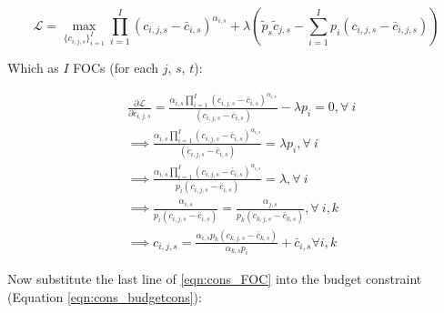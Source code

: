 \documentclass[letterpaper,12pt]{article}
\theoremstyle{definition}
\begin{document}
\begin{spacing}{1.5}
    \begin{equation} \label{eqn:cons_lagrangian}
       \mathcal{L} =  \max_{\{c_{i,j,s}\}_{i=1}^{I}}  \prod_{i=1}^I \left( c_{i,j,s} - \bar c_{i,s} \right) ^{\alpha_{i,s}}  + \lambda \left(\tilde{p}_{s}\tilde{c}_{j,s} - \sum_{i=1}^{I} p_{i}(c_{i,j,s}-\bar{c}_{i,j,s})\right)
    \end{equation}
    
    Which as $I$ FOCs (for each $j$, $s$, $t$):
    
      \begin{equation} \label{eqn:cons_FOC}
      \begin{split}
       & \frac{\partial \mathcal{L}}{\partial c_{i,j,s}} = \frac{\alpha_{i,s} \prod_{i=1}^I \left( c_{i,j,s} - \bar c_{i,s} \right) ^{\alpha_{i,s}}}{(c_{i,j,s}-\bar{c}_{i,s})}-\lambda p_{i} = 0, \forall \ i  \\
       & \implies  \frac{\alpha_{i,s} \prod_{i=1}^I \left( c_{i,j,s} - \bar c_{i,s} \right) ^{\alpha_{i,s}}}{(c_{i,j,s}-\bar{c}_{i,s})} = \lambda p_{i}, \forall \ i \\
       & \implies  \frac{\alpha_{i,s} \prod_{i=1}^I \left( c_{i,j,s} - \bar c_{i,s} \right) ^{\alpha_{i,s}}}{ p_{i}(c_{i,j,s}-\bar{c}_{i,s})} = \lambda, \forall \ i \\
       & \implies \frac{\alpha_{i,s}}{p_{i}(c_{i,j,s}-\bar{c}_{i,s})}=\frac{\alpha_{j,s}}{p_{k}(c_{k,j,s}-\bar{c}_{k,s})}, \forall \ i,k \\
       & \implies c_{i,j,s}= \frac{\alpha_{i,s} p_{k}(c_{k,j,s}-\bar{c}_{k,s})}{\alpha_{k,s} p_{i}} + \bar{c}_{i,s} \forall i,k 
       \end{split}
    \end{equation}
    
    Now substitute the last line of \ref{eqn:cons_FOC} into the budget constraint (Equation \ref{eqn:cons_budgetcons}):
    

\end{spacing}
\end{document}

